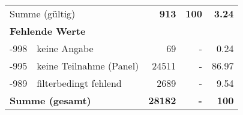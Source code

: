 \begin{longtable}{lXrrr}
     \midrule
     \multicolumn{2}{l}{Summe (gültig)} &
       \textbf{\num{913}} &
     \textbf{100} &
       \textbf{\num[round-mode=places,round-precision=2]{3.24}} \\
     \multicolumn{5}{l}{\textbf{Fehlende Werte}}\\
       -998 &
       keine Angabe &
         \num{69} &
        - &
         \num[round-mode=places,round-precision=2]{0.24} \\
       -995 &
       keine Teilnahme (Panel) &
         \num{24511} &
        - &
         \num[round-mode=places,round-precision=2]{86.97} \\
       -989 &
       filterbedingt fehlend &
         \num{2689} &
        - &
         \num[round-mode=places,round-precision=2]{9.54} \\
     \midrule
     \multicolumn{2}{l}{\textbf{Summe (gesamt)}} &
          \textbf{\num{28182}} &
        \textbf{-} &
        \textbf{100} \\
     \bottomrule
     \end{longtable}
     
